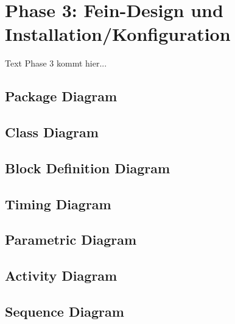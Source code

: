 \chapter{Phase 3: Fein-Design und Installation/Konfiguration}

Text Phase 3 kommt hier...


\section{Package Diagram}

\section{Class Diagram}

\section{Block Definition Diagram}

\section{Timing Diagram}

\section{Parametric Diagram}

\section{Activity Diagram}

\section{Sequence Diagram}

